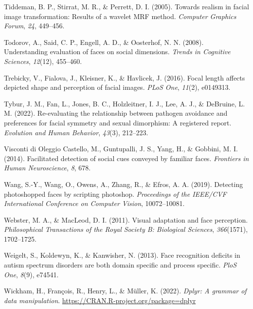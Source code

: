 \documentclass[
  doc,floatsintext]{apa6}
\newlength{\cslhangindent}
\newlength{\cslentryspacingunit} %
\newenvironment{CSLReferences}[2] %
 {%
  \setlength{\parindent}{0pt}
  \ifodd #1
  \let\oldpar\par
  \def\par{\hangindent=\cslhangindent\oldpar}
  \fi
  \setlength{\parskip}{#2\cslentryspacingunit}
 }%
 {}
\begin{document}
\begin{CSLReferences}{1}{0}
\leavevmode{}%
Tiddeman, B. P., Stirrat, M. R., \& Perrett, D. I. (2005). Towards realism in facial image transformation: Results of a wavelet MRF method. \emph{Computer Graphics Forum}, \emph{24}, 449--456.

\leavevmode{}%
Todorov, A., Said, C. P., Engell, A. D., \& Oosterhof, N. N. (2008). Understanding evaluation of faces on social dimensions. \emph{Trends in Cognitive Sciences}, \emph{12}(12), 455--460.

\leavevmode{}%
Trebicky, V., Fialova, J., Kleisner, K., \& Havlicek, J. (2016). Focal length affects depicted shape and perception of facial images. \emph{PLoS One}, \emph{11}(2), e0149313.

\leavevmode{}%
Tybur, J. M., Fan, L., Jones, B. C., Holzleitner, I. J., Lee, A. J., \& DeBruine, L. M. (2022). Re-evaluating the relationship between pathogen avoidance and preferences for facial symmetry and sexual dimorphism: A registered report. \emph{Evolution and Human Behavior}, \emph{43}(3), 212--223.

\leavevmode{}%
Visconti di Oleggio Castello, M., Guntupalli, J. S., Yang, H., \& Gobbini, M. I. (2014). Facilitated detection of social cues conveyed by familiar faces. \emph{Frontiers in Human Neuroscience}, \emph{8}, 678.

\leavevmode{}%
Wang, S.-Y., Wang, O., Owens, A., Zhang, R., \& Efros, A. A. (2019). Detecting photoshopped faces by scripting photoshop. \emph{Proceedings of the IEEE/CVF International Conference on Computer Vision}, 10072--10081.

\leavevmode{}%
Webster, M. A., \& MacLeod, D. I. (2011). Visual adaptation and face perception. \emph{Philosophical Transactions of the Royal Society B: Biological Sciences}, \emph{366}(1571), 1702--1725.

\leavevmode{}%
Weigelt, S., Koldewyn, K., \& Kanwisher, N. (2013). Face recognition deficits in autism spectrum disorders are both domain specific and process specific. \emph{PloS One}, \emph{8}(9), e74541.

\leavevmode{}%
Wickham, H., François, R., Henry, L., \& Müller, K. (2022). \emph{Dplyr: A grammar of data manipulation}. \url{https://CRAN.R-project.org/package=dplyr}


\end{CSLReferences}
\end{document}
